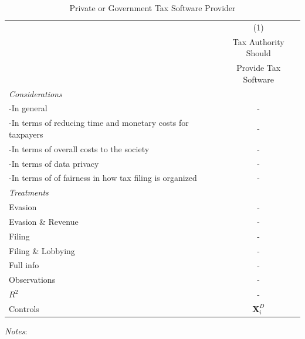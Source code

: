 \documentclass[11pt]{article}
\begin{document}
\begin{table}[!htbp]\centering
\caption{Private or Government Tax Software Provider}
\label{tab:taxsoftwareprovider}
\begin{threeparttable}
\begin{tabular}{l|c}
\toprule
& (1) \\
 & Tax Authority Should \\
 & Provide Tax Software \\
 \midrule
\textit{Considerations} \\[0.25em]
-In general & - \\[0.25em]
-In terms of reducing time and monetary costs for taxpayers & - \\[0.25em]
-In terms of overall costs to the society & - \\[0.25em]
-In terms of data privacy & - \\[0.25em]
-In terms of of fairness in how tax filing is organized & -\\[1em]
\textit{Treatments} \\[0.25em]
Evasion        & - \\[0.25em]
Evasion \& Revenue    & - \\[0.25em]
Filing             & - \\[0.25em]
Filing \& Lobbying            & - \\[0.25em]
Full info               & - \\

\midrule
Observations                        &-       \\
$R^2$                               &-    \\
Controls                 & $\mathbf{X}_{i}^{D}$      \\
\bottomrule
\end{tabular}
\begin{tablenotes}[flushleft]
\footnotesize
\item \textit{Notes}:   
\end{tablenotes}
\end{threeparttable}
\end{table} 
\end{document}
